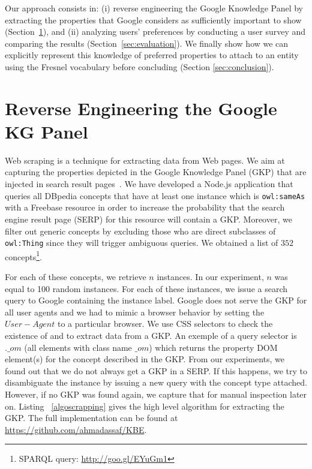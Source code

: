 \documentclass[runningheads,a4paper]{llncs}
\begin{document}
Our approach consists in: (i) reverse engineering the Google Knowledge Panel by extracting the properties that Google considers as sufficiently important to show (Section~\ref{sec:knowledge-graph}), and (ii) analyzing users' preferences by conducting a user survey and comparing the results (Section~\ref{sec:evaluation}). We finally show how we can explicitly represent this knowledge of preferred properties to attach to an entity using the Fresnel vocabulary before concluding (Section \ref{sec:conclusion}).


\section{Reverse Engineering the Google KG Panel}
\label{sec:knowledge-graph}
Web scraping is a technique for extracting data from Web pages. We aim at capturing the properties depicted in the Google Knowledge Panel (GKP) that are injected in search result pages~\cite{Bergman2012}. We have developed a Node.js application that queries all DBpedia concepts that have at least one instance which is \texttt{owl:sameAs} with a Freebase resource in order to increase the probability that the search engine result page (SERP) for this resource will contain a GKP. Moreover, we filter out generic concepts by excluding those who are direct subclasses of \texttt{owl:Thing} since they will trigger ambiguous queries. We obtained a list of $352$ concepts\footnote{SPARQL query: \url{http://goo.gl/EYuGm1}}.

For each of these concepts, we retrieve $n$ instances. In our experiment, $n$ was equal to 100 random instances. For each of these instances, we issue a search query to Google containing the instance label. Google does not serve the GKP for all user agents and we had to mimic a browser behavior by setting the $User-Agent$ to a particular browser. We use CSS selectors to check the existence of and to extract data from a GKP. An exemple of a query selector is $.\_om$ (all elements with class name $\_om$) which returns the property DOM element(s) for the concept described in the GKP. From our experiments, we found out that we do not always get a GKP in a SERP. If this happens, we try to disambiguate the instance by issuing a new query with the concept type attached. However, if no GKP was found again, we capture that for manual inspection later on. Listing ~\ref{algoscrapping} gives the high level algorithm for extracting the GKP. The full implementation can be found at \url{https://github.com/ahmadassaf/KBE}.
\end{document}
